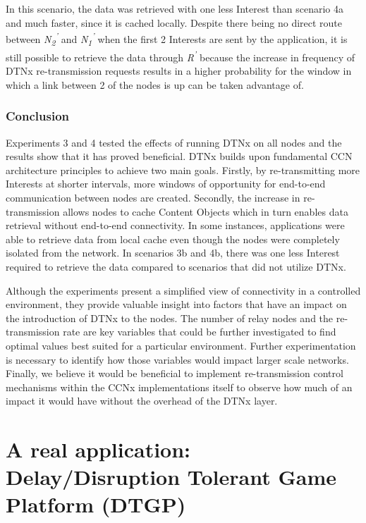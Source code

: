 \documentclass[a4paper,12pt]{report}      %
\begin{document}
In this scenario, the data was retrieved with one less Interest than scenario 4a and much faster, since it is cached locally. Despite there being no direct route between \emph{N\textsubscript{2}\textsuperscript{'}} and \emph{N\textsubscript{1}\textsuperscript{'}} when the first 2 Interests are sent by the application, it is still possible to retrieve the data through \emph{R\textsuperscript{'}} because the increase in frequency of DTNx re-transmission requests results in a higher probability for the window in which a link between 2 of the nodes is up can be taken advantage of.

\subsection{Conclusion}

Experiments 3 and 4 tested the effects of running DTNx on all nodes and the results show that it has proved beneficial. DTNx builds upon fundamental CCN architecture principles to achieve two main goals. Firstly, by re-transmitting more Interests at shorter intervals, more windows of opportunity for end-to-end communication between nodes are created. Secondly, the increase in re-transmission allows nodes to cache Content Objects which in turn enables data retrieval without end-to-end connectivity. In some instances, applications were able to retrieve data from local cache even though the nodes were completely isolated from the network. In scenarios 3b and 4b, there was one less Interest required to retrieve the data compared to scenarios that did not utilize DTNx. 

Although the experiments present a simplified view of connectivity in a controlled environment, they provide valuable insight into factors that have an impact on the introduction of DTNx to the nodes. The number of relay nodes and the re-transmission rate are key variables that could be further investigated to find optimal values best suited for a particular environment. Further experimentation is necessary to identify how those variables would impact larger scale networks. Finally, we believe it would be beneficial to implement re-transmission control mechanisms within the CCNx implementations itself to observe how much of an impact it would have without the overhead of the DTNx layer.

\pagebreak
\chapter{A real application: Delay/Disruption Tolerant Game Platform (DTGP)}
\end{document}
